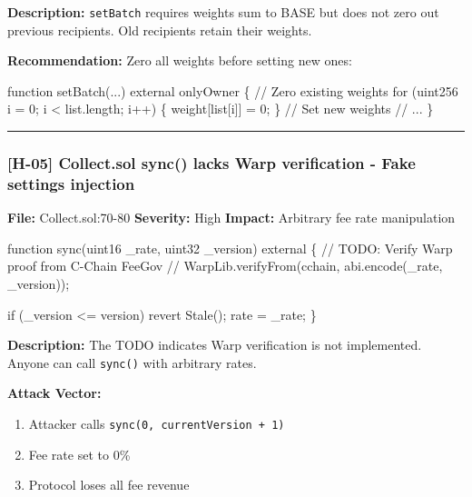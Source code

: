 \documentclass[
]{article}
\newenvironment{Shaded}{}{}
\newcommand{\NormalTok}[1]{#1}
\providecommand{\tightlist}{%
  \setlength{\itemsep}{0pt}\setlength{\parskip}{0pt}}
\begin{document}
\textbf{Description:} \texttt{setBatch} requires weights sum to BASE but
does not zero out previous recipients. Old recipients retain their
weights.

\textbf{Recommendation:} Zero all weights before setting new ones:

\begin{Shaded}
\begin{Highlighting}[]
\NormalTok{function setBatch(...) external onlyOwner \{}
\NormalTok{    // Zero existing weights}
\NormalTok{    for (uint256 i = 0; i \textless{} list.length; i++) \{}
\NormalTok{        weight[list[i]] = 0;}
\NormalTok{    \}}
\NormalTok{    // Set new weights}
\NormalTok{    // ...}
\NormalTok{\}}
\end{Highlighting}
\end{Shaded}

\begin{center}\rule{0.5\linewidth}{0.5pt}\end{center}

\subsubsection{{[}H-05{]} Collect.sol sync() lacks Warp verification -
Fake settings
injection}\label{h-05-collectsol-sync-lacks-warp-verification---fake-settings-injection}

\textbf{File:} Collect.sol:70-80 \textbf{Severity:} High
\textbf{Impact:} Arbitrary fee rate manipulation

\begin{Shaded}
\begin{Highlighting}[]
\NormalTok{function sync(uint16 \_rate, uint32 \_version) external \{}
\NormalTok{    // TODO: Verify Warp proof from C{-}Chain FeeGov}
\NormalTok{    // WarpLib.verifyFrom(cchain, abi.encode(\_rate, \_version));}

\NormalTok{    if (\_version \textless{}= version) revert Stale();}
\NormalTok{    rate = \_rate;}
\NormalTok{\}}
\end{Highlighting}
\end{Shaded}

\textbf{Description:} The TODO indicates Warp verification is not
implemented. Anyone can call \texttt{sync()} with arbitrary rates.

\textbf{Attack Vector:}

\begin{enumerate}
\def\labelenumi{\arabic{enumi}.}
\tightlist
\item
  Attacker calls \texttt{sync(0,\ currentVersion\ +\ 1)}
\item
  Fee rate set to 0\%
\item
  Protocol loses all fee revenue
\end{enumerate}
\end{document}
